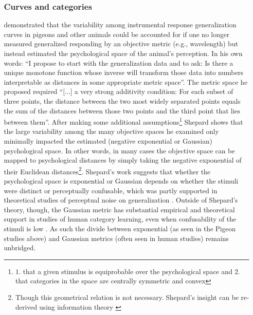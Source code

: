 \documentclass[doc,12pt]{apa}        %
\begin{document}
\subsubsection{Curves and categories}
\label{subsub:curves}
 demonstrated that the variability among instrumental response generalization curves in pigeons and other animals could be accounted for if one no longer measured generalized responding by an objective metric (e.g., wavelength) but instead estimated the psychological space of the animal's perception.  In his own words: ``I propose to start with the generalization data and to ask: Is there a unique monotone function whose inverse will transform those data into numbers interpretable as distances in some appropriate metric space''. The metric space he proposed required ``[...] a very strong additivity condition: For each subset of three points, the distance between the two most widely separated points equals the sum of the distances between those two points and the third point that lies between them''.  After making some additional assumptions\footnote{
    $1.$ that a given stimulus is equiprobable over the psychological space and $2.$ that categories in the space are centrally symmetric and convex
} Shepard shows that the large variability among the many objective spaces he examined only minimally impacted the estimated (negative exponential or Gaussian) psychological space.  In other words, in many cases the objective space can be mapped to psychological distances by simply taking the negative exponential of their Euclidean distances\footnote{
    Though this geometrical relation is not necessary.  Shepard's insight can be re-derived using information theory \cite{Chatera:2003p9103}}.  Shepard's work suggests that whether the psychological space is exponential or Gaussian depends on whether the stimuli were distinct or perceptually confusable, which was partly supported in theoretical studies of perceptual noise on generalization \cite{Ennis:1988p9359}.  Outside of Shepard's theory, though, the Gaussian metric has substantial empirical and theoretical support in studies of human category learning, even when confusability of the stimuli is low \cite{Nosofsky:1985p9356,Medin:2012p9358}.  As such the divide between exponential (as seen in the Pigeon studies above) and Gaussian metrics (often seen in human studies) remains unbridged.
\end{document}
